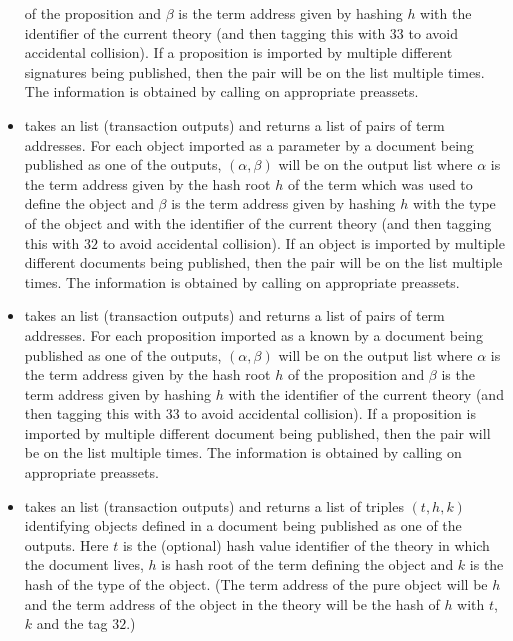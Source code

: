 \begin{itemize}
of the proposition
and $\beta$ is the term address given by hashing $h$ with the identifier of the current theory
(and then tagging this with $33$ to avoid accidental collision).
If a proposition is imported by multiple
different signatures being published, then the pair will be on the list multiple times.
The information is obtained by calling {} on appropriate preassets.
\item {} takes
an {} list (transaction outputs)
and returns a list of pairs of term addresses.
For each object imported as a parameter by a document being published as one of the outputs,
$(\alpha,\beta)$ will be on the output list
where $\alpha$ is the term address given by the hash root $h$
of the term which was used to define the object
and $\beta$ is the term address given by hashing $h$ with the type of the object and with the identifier of the current theory
(and then tagging this with $32$ to avoid accidental collision).
If an object is imported by multiple
different documents being published, then the pair will be on the list multiple times.
The information is obtained by calling {} on appropriate preassets.
\item {} takes
an {} list (transaction outputs)
and returns a list of pairs of term addresses.
For each proposition imported as a known by a document being published as one of the outputs,
$(\alpha,\beta)$ will be on the output list
where $\alpha$ is the term address given by the hash root $h$
of the proposition
and $\beta$ is the term address given by hashing $h$ with the identifier of the current theory
(and then tagging this with $33$ to avoid accidental collision).
If a proposition is imported by multiple
different document being published, then the pair will be on the list multiple times.
The information is obtained by calling {} on appropriate preassets.
\item {} takes
an {} list (transaction outputs)
and returns a list of triples $(t,h,k)$
identifying objects defined in a document being published as one of the outputs.
Here $t$ is the (optional) hash value identifier of the theory in which the document lives,
$h$ is hash root of the term defining the object
and $k$ is the hash of the type of the object.
(The term address of the pure object will be $h$
and the term address of the object in the theory will be the hash of
$h$ with $t$, $k$ and the tag $32$.)

\end{itemize}
